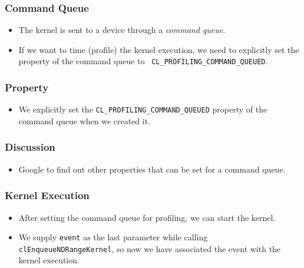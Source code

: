 \documentclass{beamer}
\begin{document}
\begin{frame}
  \frametitle{Command Queue}
  \begin{itemize}
    \item The kernel is sent to a device through a {\em command
      queue}.
    \item If we want to time (profile) the kernel execution, we need
      to explicitly set the property of the command queue to {\tt
        CL\_PROFILING\_COMMAND\_QUEUED}.  
  \end{itemize}
\end{frame}

\begin{frame}
\end{frame}

\begin{frame}
  \frametitle{Property}
  \begin{itemize}
    \item We explicitly set the {\tt CL\_PROFILING\_COMMAND\_QUEUED}
      property of the command queue when we created it.
  \end{itemize}
\end{frame}

\begin{frame}
\end{frame}

\begin{frame}
  \frametitle{Discussion}
  \begin{itemize}
    \item Google to find out other properties that can be set for a
      command queue.
  \end{itemize}
\end{frame}

\begin{frame}
  \frametitle{Kernel Execution}
  \begin{itemize}
  \item After setting the command queue for profiling, we can start
    the kernel.
  \item We supply {\tt event} as the last parameter while calling
    {\tt clEnqueueNDRangeKernel}, so now we have associated the
    event with the kernel execution.
  \end{itemize}
\end{frame}

\begin{frame}
\end{frame}
\end{document}
